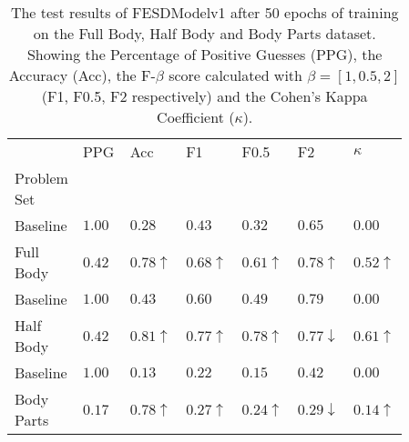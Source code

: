     \begin{table}[!htbp]
        \caption[Test Results of FESDModelv1]{The test results of FESDModelv1 after 50 epochs of training on the Full Body, Half Body and Body Parts dataset. Showing the Percentage of Positive Guesses (PPG), the Accuracy (Acc), the F-$\beta$ score calculated with $\beta = [1, 0.5, 2]$ (F1, F0.5, F2 respectively) and the Cohen's Kappa Coefficient ($\kappa$).}
        \label{tab:res_v1}
        \begin{tabular}{p{0.14\linewidth}p{0.12\linewidth}p{0.12\linewidth}p{0.12\linewidth}p{0.12\linewidth}p{0.12\linewidth}p{0.12\linewidth}}
\hline
{} &   PPG &  Acc &   F1 &  F0.5 &   F2 &  $\kappa$ \\
Problem Set   &       &      &      &       &      &           \\
\hline 
\hline
Baseline    & $1.00$ &	$0.28$ &	$0.43$ &	$0.32$ &	$0.65$ &	$0.00$ \\
Full Body   & $0.42$ &	$0.78\uparrow$ &	$0.68\uparrow$ &	$0.61\uparrow$ &	$0.78\uparrow$ &	$0.52\uparrow$ \\
\hline
Baseline    & $1.00$ &	$0.43$ &	$0.60$ &	$0.49$ & 	$0.79$ &	$0.00$ \\
Half Body   & $0.42$ &	$0.81\uparrow$ &	$0.77\uparrow$ &	$0.78\uparrow$ &	$0.77\downarrow$ &	$0.61\uparrow$ \\
\hline
Baseline    & $1.00$ &	$0.13$ &	$0.22$ &	$0.15$ &	$0.42$ &	$0.00$ \\
Body Parts  & $0.17$ &	$0.78\uparrow$ &	$0.27\uparrow$ &	$0.24\uparrow$ &	$0.29\downarrow$ &	$0.14\uparrow$ \\

\hline
\end{tabular}

    \end{table}
